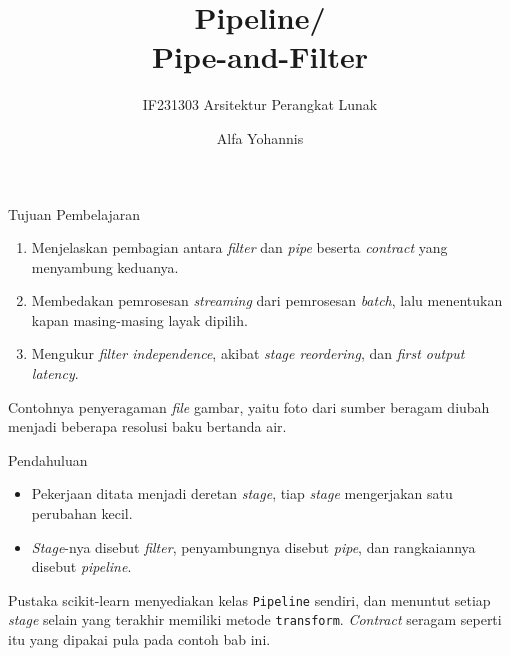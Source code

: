 \documentclass[aspectratio=169, table, 12pt]{beamer}
\title{\Huge{Pipeline/\\Pipe-and-Filter}}
\subtitle{IF231303 Arsitektur Perangkat Lunak}
\author{Alfa Yohannis}
\begin{document}
\frame{\titlepage}

\begin{frame}{{\Large Tujuan Pembelajaran}}
  \vspace{10pt}
  \begin{enumerate}
    \item Menjelaskan pembagian antara \textit{filter} dan \textit{pipe} beserta
          \textit{contract} yang menyambung keduanya.
    \item Membedakan pemrosesan \textit{streaming} dari pemrosesan
          \textit{batch}, lalu menentukan kapan masing-masing layak dipilih.
    \item Mengukur \textit{filter independence}, akibat \textit{stage
          reordering}, dan \textit{first output latency}.
  \end{enumerate}

  \vspace{10pt}
  {\small Contohnya penyeragaman \textit{file} gambar, yaitu foto dari sumber
  beragam diubah menjadi beberapa resolusi baku bertanda air.}
\end{frame}

\begin{frame}{{\Large Pendahuluan}}
  \vspace{8pt}
  \begin{itemize}\small
    \item Pekerjaan ditata menjadi deretan \textit{stage}, tiap \textit{stage}
          mengerjakan satu perubahan kecil.
    \item \textit{Stage}-nya disebut \textit{filter}, penyambungnya disebut
          \textit{pipe}, dan rangkaiannya disebut \textit{pipeline}.
  \end{itemize}

  \vspace{8pt}
  {\small Pustaka scikit-learn menyediakan kelas \texttt{Pipeline} sendiri,
  dan menuntut setiap \textit{stage} selain yang terakhir memiliki metode
  \texttt{transform}. \textit{Contract} seragam seperti itu yang dipakai pula
  pada contoh bab ini.}
\end{frame}
\end{document}

